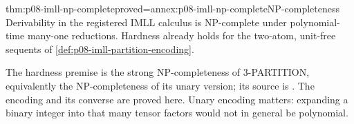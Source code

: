 \begin{hbcorollary}{thm:p08-imll-np-complete}{proved=annex:p08-imll-np-complete}{NP-completeness}
Derivability in the registered IMLL calculus is NP-complete under
polynomial-time many-one reductions.  Hardness already holds for the
two-atom, unit-free sequents of \cref{def:p08-imll-partition-encoding}.
\end{hbcorollary}

The hardness premise is the strong NP-completeness of 3-PARTITION,
equivalently the NP-completeness of its unary version; its source is
\textcite[Theorem~4.4]{GareyJohnson1979}.  The encoding and its converse
are proved here.  Unary encoding matters: expanding a binary integer
into that many tensor factors would not in general be polynomial.
